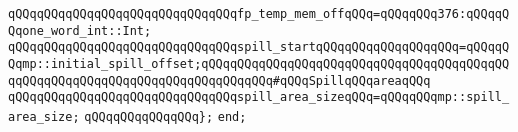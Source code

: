 \verb|qQQqqQQqqQQqqQQqqQQqqQQqqQQqqQQqfp_temp_mem_offqQQq=qQQqqQQq376:qQQqqQQqone_word_int::Int;|\newline
\newline
\verb|qQQqqQQqqQQqqQQqqQQqqQQqqQQqqQQqspill_startqQQqqQQqqQQqqQQqqQQq=qQQqqQQqmp::initial_spill_offset;qQQqqQQqqQQqqQQqqQQqqQQqqQQqqQQqqQQqqQQqqQQqqQQqqQQqqQQqqQQqqQQqqQQqqQQqqQQqqQQq#qQQqSpillqQQqareaqQQq|\newline
\verb|qQQqqQQqqQQqqQQqqQQqqQQqqQQqqQQqspill_area_sizeqQQq=qQQqqQQqmp::spill_area_size;|\newline
\verb|qQQqqQQqqQQqqQQq};|\newline
\verb|end;|\newline

